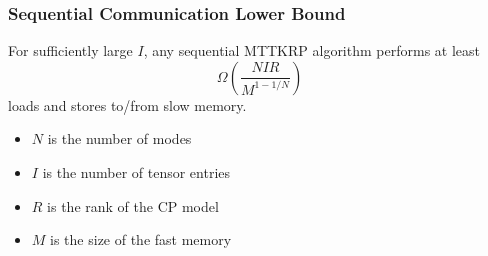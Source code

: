 \documentclass[xcolor=dvipsnames]{beamer}
\begin{document}
\begin{frame}
\frametitle{Sequential Communication Lower Bound}

\begin{theorem}
For sufficiently large $I$, any sequential MTTKRP algorithm performs at least
\begin{equation*}
\Omega\left(\frac{NIR}{M^{1-1/N}}\right)
\end{equation*}
loads and stores to/from slow memory.
\end{theorem}

\vfill

\small
\begin{itemize}
	\item $N$ is the number of modes
	\item $I$ is the number of tensor entries
	\item $R$ is the rank of the CP model
	\item $M$ is the size of the fast memory
\end{itemize}


\end{frame}
\end{document}
